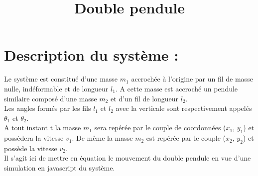 \documentclass{article}
\date{}
\title{Double pendule}
\begin{document}
\maketitle


\section{Description du système :}
Le système est constitué d'une masse $m_{1}$ accrochée à l'origine par un fil de masse nulle, indéformable et de longueur $l_{1}$. A cette masse est accroché un pendule similaire composé d'une masse $m_{2}$ et d'un fil de longueur $l_{2}$.\\
Les angles formés par les fils $l_{1}$ et $l_{2}$ avec la verticale sont respectivement appelés $\theta_{1}$ et $\theta_{2}$.\\
A tout instant t la masse $m_{1}$ sera repérée par le couple de coordonnées ($x_{1}$, $y_{1}$) et possèdera la vitesse $v_{1}$. De même la masse $m_{2}$ est repérée par le couple ($x_{2}$, $y_{2}$) et possède la vitesse $v_{2}$.\\
Il s'agit ici de mettre en équation le mouvement du double pendule en vue d'une simulation en javascript du système.\\
\begin{center}
\end{center}
\end{document}
